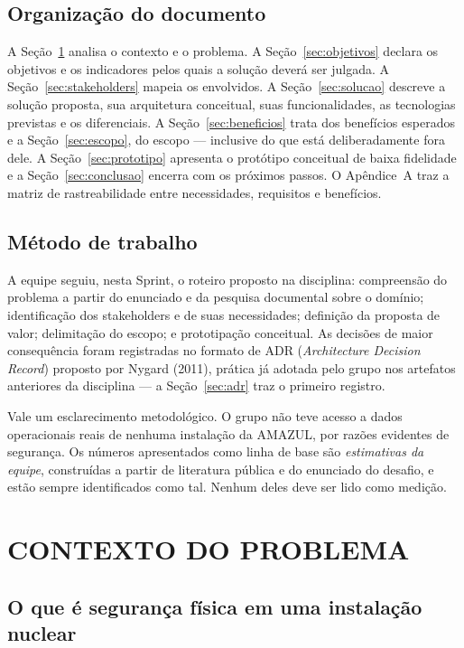 \documentclass[12pt,a4paper,oneside]{article}
\begin{document}
\subsection{Organização do documento}

A Seção~\ref{sec:contexto} analisa o contexto e o problema. A
Seção~\ref{sec:objetivos} declara os objetivos e os indicadores pelos quais a
solução deverá ser julgada. A Seção~\ref{sec:stakeholders} mapeia os
envolvidos. A Seção~\ref{sec:solucao} descreve a solução proposta, sua
arquitetura conceitual, suas funcionalidades, as tecnologias previstas e os
diferenciais. A Seção~\ref{sec:beneficios} trata dos benefícios esperados e a
Seção~\ref{sec:escopo}, do escopo — inclusive do que está deliberadamente fora
dele. A Seção~\ref{sec:prototipo} apresenta o protótipo conceitual de baixa
fidelidade e a Seção~\ref{sec:conclusao} encerra com os próximos passos. O
Apêndice~A traz a matriz de rastreabilidade entre necessidades, requisitos e
benefícios.

\subsection{Método de trabalho}

A equipe seguiu, nesta Sprint, o roteiro proposto na disciplina: compreensão do
problema a partir do enunciado e da pesquisa documental sobre o domínio;
identificação dos stakeholders e de suas necessidades; definição da proposta de
valor; delimitação do escopo; e prototipação conceitual. As decisões de maior
consequência foram registradas no formato de ADR (\emph{Architecture Decision
Record}) proposto por Nygard (2011), prática já adotada pelo grupo nos
artefatos anteriores da disciplina — a Seção~\ref{sec:adr} traz o primeiro
registro.

Vale um esclarecimento metodológico. O grupo não teve acesso a dados
operacionais reais de nenhuma instalação da AMAZUL, por razões evidentes de
segurança. Os números apresentados como linha de base são \emph{estimativas da
equipe}, construídas a partir de literatura pública e do enunciado do desafio,
e estão sempre identificados como tal. Nenhum deles deve ser lido como medição.

\section{CONTEXTO DO PROBLEMA}
\label{sec:contexto}

\subsection{O que é segurança física em uma instalação nuclear}
\end{document}
